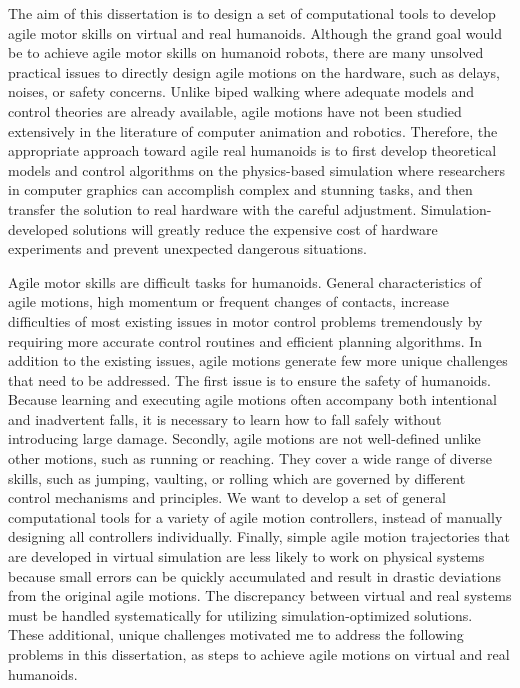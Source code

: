 The aim of this dissertation is to design a set of computational tools to
develop agile motor skills on virtual and real humanoids.
Although the grand goal would be to achieve agile motor skills on humanoid
robots, there are many unsolved practical issues to directly
design agile 
motions on the hardware, such as delays, noises, or safety concerns.
Unlike biped walking where adequate models and control theories are
already available, agile motions have not been studied extensively in the
literature of computer animation and robotics.
Therefore, the appropriate approach toward agile real humanoids is to first
develop theoretical models and control algorithms on the physics-based
simulation where researchers in computer graphics can accomplish complex and
stunning tasks, and then transfer the solution to real hardware
with the careful adjustment.
Simulation-developed solutions will
greatly reduce the expensive cost of hardware experiments and prevent
unexpected dangerous situations.

Agile motor skills are difficult tasks for humanoids.
General characteristics of agile motions, high momentum or frequent changes
of contacts, increase difficulties of most existing issues in motor control
problems tremendously
by requiring more accurate control routines and efficient planning
algorithms.
In addition to the existing issues, agile motions generate few more unique
challenges that need to be addressed. 
The first issue is to ensure the safety of humanoids.
Because learning and executing agile motions often accompany both intentional
and inadvertent falls, it is necessary to learn how to fall safely without
introducing large damage.
Secondly, agile motions are not well-defined unlike other motions,
such as running or reaching.
They cover a wide range of diverse skills, such as jumping, vaulting, or
rolling which are governed by different control mechanisms and principles.
We want to develop a set of general computational tools for a variety
of agile motion controllers, instead of manually designing all controllers
individually.  
Finally, simple agile motion trajectories that are developed in virtual
simulation are less likely to work on physical systems
because small errors can be quickly accumulated and result in drastic deviations
from the original agile motions.
The discrepancy between virtual and real systems must be handled
systematically for utilizing simulation-optimized solutions.
These additional, unique challenges motivated me to address the following 
problems in this dissertation, as steps to achieve agile motions 
on virtual and real humanoids.

